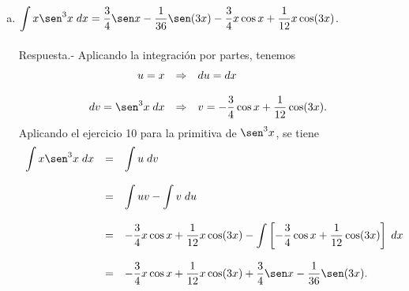 \begin{enumerate}[\bfseries 1.]
\begin{enumerate}[(a)]
	    \item $\displaystyle\int x\sen^3 x\; dx = \dfrac{3}{4}\sen x - \dfrac{1}{36}\sen(3x)-\dfrac{3}{4}x\cos x + \dfrac{1}{12}x\cos (3x)$.\\\\
		Respuesta.-\; Aplicando la integración por partes, tenemos
		$$
		\begin{array}{rcl}
		    u=x&\Rightarrow&du=dx\\\\
		    dv=\sen^3 x\; dx &\Rightarrow&v=-\dfrac{3}{4}\cos x + \dfrac{1}{12}\cos(3x).
		\end{array}
		$$
		Aplicando el ejercicio 10 para la primitiva de $\sen^3 x$, se tiene
		$$
		\begin{array}{rcl}
		    \displaystyle\int x\sen^3 x\; dx&=&\displaystyle\int u\; dv\\\\
				    &=&\displaystyle\int uv - \int v\; du\\\\
				    &=&-\dfrac{3}{4}x\cos x + \dfrac{1}{12}x\cos (3x)-\displaystyle\int\left[-\dfrac{3}{4}\cos x + \dfrac{1}{12}\cos(3x)\right]\; dx\\\\
				    &=&-\dfrac{3}{4}x\cos x + \dfrac{1}{12}x\cos (3x)+\dfrac{3}{4}\sen x - \dfrac{1}{36}\sen(3x).
		\end{array}
		$$
		\vspace{.5cm}


\end{enumerate}
\end{enumerate}
